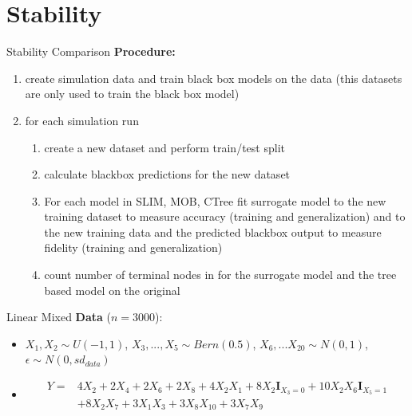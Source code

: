 \documentclass[9pt, xcolor=table]{beamer}
\begin{document}
\section{Stability}
\begin{frame}{Stability Comparison}
\textbf{Procedure:} 
\begin{enumerate}
    \item create simulation data and train black box models on the data (this datasets are only used to train the black box model)
    \item for each simulation run 
    \begin{enumerate}
        \item create a new dataset and perform train/test split
        \item calculate blackbox predictions for the new dataset
        \item For each model in SLIM, MOB, CTree fit surrogate model to the new training dataset to measure accuracy (training and generalization) and to the new training data and the predicted blackbox output to measure fidelity (training and generalization)
        \item count number of terminal nodes in for the surrogate model and the tree based model on the original 
    \end{enumerate}
\end{enumerate}
\end{frame}

\begin{frame}{Linear Mixed}
\textbf{Data} ($n= 3000$):
\begin{itemize}
    \item $X_1, X_2 \sim U(-1,1)$, $X_3, ..., X_5 \sim Bern(0.5)$, $X_6, ... X_20 \sim N(0,1)$,  $\epsilon \sim N(0, sd_{data})$
    \item \begin{align*}
    Y = & 4   X_2 + 2   X_4 + 2   X_6 + 2   X_8 + 4   X_2   X_1 + 8   X_2   \mathbf{I}_{X_3 = 0} + 10   X_2   X_6    \mathbf{I}_{X_5 = 1} \\
    & + 8   X_2   X_7 + 3   X_1   X_3 + 3   X_8   X_{10} + 3   X_7   X_9     
    \end{align*}
    
\end{itemize}

\end{frame}
\end{document}
